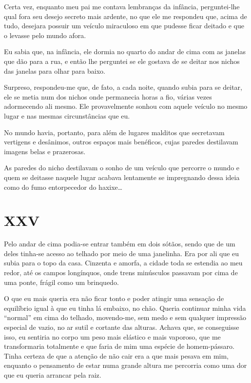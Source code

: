 Certa vez, enquanto meu pai me contava lembranças da infância, perguntei-lhe qual fora seu desejo secreto mais ardente, no que ele me respondeu que, acima de tudo, desejara possuir um veículo miraculoso em que pudesse ficar deitado e que o levasse pelo mundo afora.

Eu sabia que, na infância, ele dormia no quarto do andar de cima com as janelas que dão para a rua, e então lhe perguntei se ele gostava de se deitar nos nichos das janelas para olhar para baixo.

Surpreso, respondeu-me que, de fato, a cada noite, quando subia para se deitar, ele se metia num dos nichos onde permanecia horas a fio, várias vezes adormecendo ali mesmo. Ele provavelmente sonhou com aquele veículo no mesmo lugar e nas mesmas circunstâncias que eu.

No mundo havia, portanto, para além de lugares malditos que secretavam vertigens e desânimos, outros espaços mais benéficos, cujas paredes destilavam imagens belas e prazerosas.

As paredes do nicho destilavam o sonho de um veículo que percorre o mundo e quem se deitasse naquele lugar acabava lentamente se impregnando dessa ideia como do fumo entorpecedor do haxixe\dots


\chapter*{\centering\Large{XXV}}

Pelo andar de cima podia-se entrar também em dois sótãos, sendo que de um deles tinha-se acesso ao telhado por meio de uma janelinha. Era por ali que eu subia para o topo da casa. Cinzenta e amorfa, a cidade toda se estendia ao meu redor, até os campos longínquos, onde trens minúsculos passavam por cima de uma ponte, frágil como um brinquedo.

O que eu mais queria era não ficar tonto e poder atingir uma sensação de equilíbrio igual à que eu tinha lá embaixo, no chão. Queria continuar minha vida ``normal'' em cima do telhado, movendo-me, sem medo e sem qualquer impressão especial de vazio, no ar sutil e cortante das alturas. Achava que, se conseguisse isso, eu sentiria no corpo um peso mais elástico e mais vaporoso, que me transformaria totalmente e que faria de mim uma espécie de homem-pássaro. Tinha certeza de que a atenção de não cair era a que mais pesava em mim, enquanto o pensamento de estar numa grande altura me percorria como uma dor que eu queria arrancar pela raiz.

